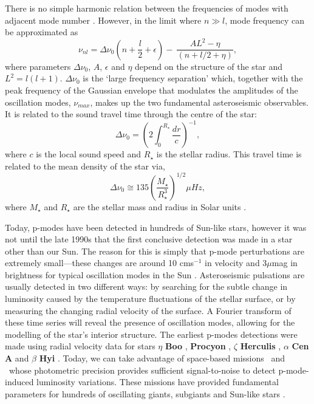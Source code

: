 There is no simple harmonic relation between the frequencies of modes with
adjacent mode number \citep{brown}.
However, in the limit where $n \gg l$, mode frequency can be approximated as
\begin{equation}
    \nu_{nl} = \Delta\nu_0\left(n + \frac{l}{2} + \epsilon \right) - \
    \frac{AL^2 - \eta}{(n + l/2 + \eta)},
\end{equation}
where parameters $\Delta\nu_0$, $A$, $\epsilon$ and $\eta$ depend on the
structure of the star and $L^2 = l(l+1)$.
$\Delta\nu_0$ is the `large frequency separation' which, together with the
peak frequency of the Gaussian envelope that modulates the amplitudes of the
oscillation modes, $\nu_{max}$, makes up the two fundamental asteroseismic
observables.
It is related to the sound travel time through the centre of the star:
\begin{equation}
\Delta\nu_0 = \left(2\int_0^{R_\star}\frac{dr}{c}\right)^{-1},
\end{equation}
where $c$ is the local sound speed and $R_\star$ is the stellar radius.
This travel time is related to the mean density of the star via,
\begin{equation}
\Delta\nu_0 \cong 135\left(\frac{M_\star}{R_\star^3}\right)^{1/2}\mu Hz,
\end{equation}
where $M_\star$ and $R_\star$ are the stellar mass and radius in Solar units
\citep{cox, brown}.

Today, p-modes have been detected in hundreds of Sun-like stars, however it
was not until the late 1990s that the first conclusive detection was made in
a star other than our Sun.
The reason for this is simply that p-mode perturbations are extremely
small---these changes are around 10 cms$^{-1}$ in velocity and 3$\mu$mag in
brightness for typical oscillation modes in the Sun \citep{brown2000}.
Asteroseismic pulsations are usually detected in two different ways: by
searching for the subtle change in luminosity caused by the temperature
fluctuations of the stellar surface, or by measuring the changing radial
velocity of the surface.
A Fourier transform of these time series will reveal the presence of
oscillation modes, allowing for the modelling of the star's interior
structure.
The earliest p-modes detections were made using radial velocity data
\citep{kjeldsen2001} for stars $\eta$ {\bf Boo} \citep{kjeldsen1995}, {\bf
Procyon} \citep{barban1999, martic1999}, $\zeta$ {\bf Herculis}
\citep{martic2001}, $\alpha$ {\bf Cen A} \citep{kjeldsen1999} and $\beta$ {\bf
Hyi} \citep{bedding2001}.
Today, we can take advantage of space-based missions \kepler\ and \corot\
whose photometric precision provides sufficient signal-to-noise to detect
p-mode-induced luminosity variations.
These missions have provided fundamental parameters for hundreds of
oscillating giants, subgiants and Sun-like stars \citep[e.g.][]{michel2008,
bruntt2009, chaplin2014}.

